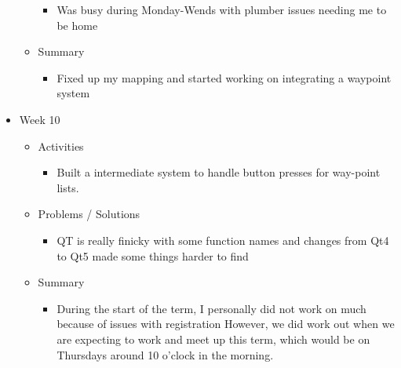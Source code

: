 \begin{itemize}
\begin{itemize}
\begin{itemize}
\item Was busy during Monday-Wends with plumber issues needing me to be home
\end{itemize}
\item Summary
\begin{itemize}
\item Fixed up my mapping and started working on integrating a waypoint system
\end{itemize}
\end{itemize}
\item{Week 10}
\begin{itemize}
\item Activities
\begin{itemize}
\item Built a intermediate system to handle button presses for way-point lists.
\end{itemize}
\item Problems / Solutions
\begin{itemize}
\item QT is really finicky with some function names and changes from Qt4 to Qt5 made some things harder to find 
\end{itemize}
\item Summary
\begin{itemize}
\item During the start of the term, I personally did not work on much because of issues with registration 
However, we did work out when we are expecting to work and meet up this term, which would be on Thursdays around 10 o'clock in the morning.
\end{itemize}
\end{itemize}
\end{itemize}
